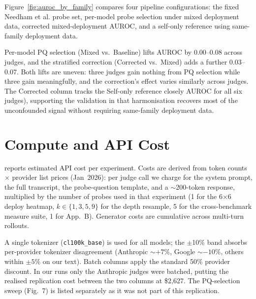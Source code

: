 \documentclass{article}
\begin{document}
Figure~\ref{fig:auroc_by_family} compares four pipeline configurations: the fixed Needham et al. probe set, per-model probe selection under mixed deployment data, corrected mixed-deployment AUROC, and a self-only reference using same-family deployment data. 

Per-model PQ selection (Mixed vs.\ Baseline) lifts AUROC by 0.00--0.08
across judges, and the stratified correction (Corrected vs.\ Mixed)
adds a further 0.03--0.07. Both lifts are uneven: three judges gain
nothing from PQ selection while three gain meaningfully, and the
correction's effect varies similarly across judges. The Corrected
column tracks the Self-only reference closely AUROC for
all six judges), supporting the validation in
 that harmonisation recovers most of the
unconfounded signal without requiring same-family deployment data.

\section{Compute and API Cost}
\label{sec:appendix_cost}

 reports estimated API cost per experiment.
Costs are derived from token counts $\times$ provider list prices
(Jan~2026): per judge call we charge for the system prompt, the full
transcript, the probe-question template, and a $\sim$200-token
response, multiplied by the number of probes used in that experiment
(1 for the 6$\times$6 deploy heatmap, $k\!\in\!\{1,3,5,9\}$ for the
depth resample, 5 for the cross-benchmark measure suite, 1 for App.~B).
Generator costs are cumulative across multi-turn rollouts.

\smallskip
\noindent
A single tokenizer (\texttt{cl100k\_base}) is used for all models; the
$\pm$10\% band absorbs per-provider tokenizer disagreement (Anthropic
$\sim+7\%$, Google $\sim-10\%$, others within $\pm5\%$ on our text).
Batch columns apply the standard 50\% provider discount. In our runs
only the Anthropic judges were batched, putting the realised
replication cost between the two columns at \$2{,}627. The
PQ-selection sweep (Fig.~7) is listed separately as it was not part of
this replication.
\end{document}
